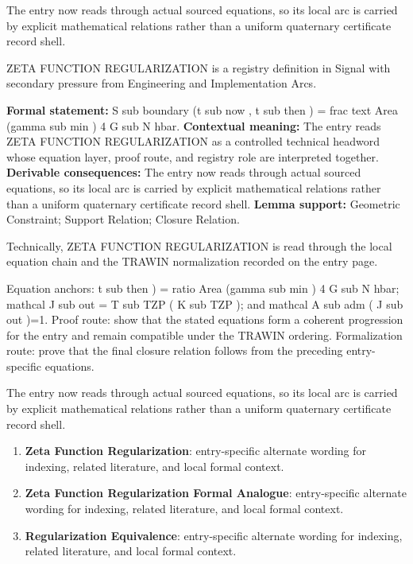 The entry now reads through actual sourced equations, so its local arc is carried by explicit mathematical relations rather than a uniform quaternary certificate record shell.
\clearpage


\begingroup\small
{}
ZETA FUNCTION REGULARIZATION is a registry definition in Signal with secondary pressure from Engineering and Implementation Arcs.

\begingroup\footnotesize\setlength{\emergencystretch}{3em}\sloppy
\textbf{Formal statement:} S sub boundary (t sub now , t sub then ) = frac text Area (gamma sub min ) 4 G sub N hbar. \textbf{Contextual meaning:} The entry reads ZETA FUNCTION REGULARIZATION as a controlled technical headword whose equation layer, proof route, and registry role are interpreted together. \textbf{Derivable consequences:} The entry now reads through actual sourced equations, so its local arc is carried by explicit mathematical relations rather than a uniform quaternary certificate record shell. \textbf{Lemma support:} Geometric Constraint; Support Relation; Closure Relation.\par
\endgroup

Technically, ZETA FUNCTION REGULARIZATION is read through the local equation chain and the TRAWIN normalization recorded on the entry page.

Equation anchors: t sub then ) = ratio Area (gamma sub min ) 4 G sub N hbar; mathcal J sub out = T sub TZP ( K sub TZP ); and mathcal A sub adm ( J sub out )=1. Proof route: show that the stated equations form a coherent progression for the entry and remain compatible under the TRAWIN ordering. Formalization route: prove that the final closure relation follows from the preceding entry-specific equations.

The entry now reads through actual sourced equations, so its local arc is carried by explicit mathematical relations rather than a uniform quaternary certificate record shell.
\endgroup

\begin{enumerate}[leftmargin=1.6em,itemsep=6pt,topsep=4pt]
\item \textbf{Zeta Function Regularization}: entry-specific alternate wording for indexing, related literature, and local formal context.
\item \textbf{Zeta Function Regularization Formal Analogue}: entry-specific alternate wording for indexing, related literature, and local formal context.
\item \textbf{Regularization Equivalence}: entry-specific alternate wording for indexing, related literature, and local formal context.
\end{enumerate}

